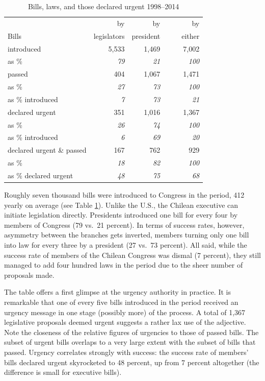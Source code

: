 \documentclass[letter,12pt]{article}
\begin{document}
\begin{table}
\centering
\begin{tabular}{lrrr}
                         &  by           &  by          &    by      \\
Bills                    &  legislators  &  president   &    ~~~~either  \\ \hline
introduced               &        5,533  &       1,469  &     7,002  \\
as \%                    &    \emph{79}  &   \emph{21}  & \emph{100} \\ \hdashline
passed                   &          404  &       1,067  &     1,471  \\
as \%                    &    \emph{27}  &   \emph{73}  & \emph{100} \\
as \% introduced         &     \emph{7}  &   \emph{73}  &  \emph{21} \\ \hdashline
declared urgent          &          351  &       1,016  &     1,367  \\
as \%                    &    \emph{26}  &   \emph{74}  & \emph{100} \\
as \% introduced         &     \emph{6}  &   \emph{69}  &  \emph{20} \\ \hdashline
declared urgent \& passed&          167  &         762  &       929  \\
as \%                    &    \emph{18}  &   \emph{82}  & \emph{100} \\
as \% declared urgent    &    \emph{48}  &   \emph{75}  &  \emph{68} \\ \hline
\end{tabular}
\caption{Bills, laws, and those declared urgent 1998--2014}\label{T:billDescriptives}
\end{table}

Roughly seven thousand bills were introduced to Congress in the period, 412 yearly on average (see Table \ref{T:billDescriptives}). Unlike the U.S., the Chilean executive can initiate legislation directly. Presidents introduced one bill for every four by members of Congress (79 vs.\ 21 percent). In terms of success rates, however, asymmetry between the branches gets inverted, members turning only one bill into law for every three by a president (27 vs.\ 73 percent). All said, while the success rate of members of the Chilean Congress was dismal (7 percent), they still managed to add four hundred laws in the period due to the sheer number of proposals made. 

The table offers a first glimpse at the urgency authority in practice. It is remarkable that one of every five bills introduced in the period received an urgency message in one stage (possibly more) of the process. A total of 1,367 legislative proposals deemed urgent suggests a rather lax use of the adjective. Note the closeness of the relative figures of urgencies to those of passed bills. The subset of urgent bills overlaps to a very large extent with the subset of bills that passed. Urgency correlates strongly with success: the success rate of members' bills declared urgent skyrocketed to 48 percent, up from 7 percent altogether (the difference is small for executive bills). 
\end{document}
